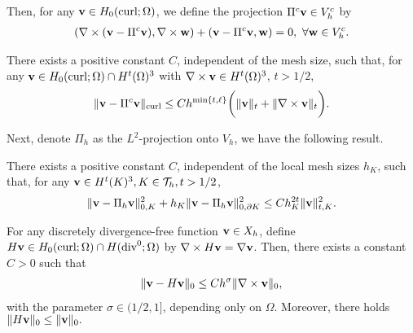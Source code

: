 \documentclass[final,leqno]{siamltex704}
\newcommand{\bv}{{\bf v}}
\def\bv{{\bf v}}
\def\bw{{\bf w}}
\begin{document}
Then, for any $\bv\in H_0(\text{curl};\Omega)$, we define the projection $\Pi^c\bv\in V_h^c$ by
\begin{eqnarray}
(\nabla\times(\bv-\Pi^c\bv),\nabla\times\bw)+(\bv-\Pi^c\bv,\bw)=0,\ \forall\bw\in V_h^c.
\end{eqnarray}

\begin{lemma}
There exists a positive constant $C$, independent of the mesh size, such that, for any $\bv\in H_0(\text{curl};\Omega)\cap H^t(\Omega)^3$ with $\nabla\times\bv\in H^t(\Omega)^3$, $t>1/2$,
\begin{eqnarray}
\|\bv-\Pi^c\bv\|_\text{curl}\le Ch^{\min\{t,\ell\}}\bigg(\|\bv\|_t+\|\nabla\times\bv\|_t\bigg).
\end{eqnarray}
\end{lemma}

Next, denote $\Pi_h$ as the $L^2$-projection onto $V_h$, we have the following result.
\begin{lemma}
There exists a positive constant $C$, independent of the local mesh sizes $h_K$, such that, for any $\bv\in H^t(K)^3, K\in\mathcal{T}_h, t>1/2$,
\begin{eqnarray}
\|\bv-\Pi_h\bv\|_{0,K}^2+h_K\|\bv-\Pi_h\bv\|_{0,\partial K}^2\le Ch_K^{2t}\|\bv\|_{t,K}^2.
\end{eqnarray}
\end{lemma}

\begin{lemma}
For any discretely divergence-free function $\bv\in X_h$, define $H\bv\in H_0(\text{curl};\Omega)\cap H(\text{div}^0;\Omega)$ by $\nabla\times H\bv=\nabla\bv$. Then, there exists a constant $C>0$ such that
\begin{eqnarray}
\|\bv-H\bv\|_0\le Ch^{\sigma}\|\nabla\times\bv\|_0,
\end{eqnarray}
with the parameter $\sigma\in (1/2,1]$, depending only on $\Omega$. Moreover, there holds $\|H\bv\|_0\le \|\bv\|_0.$
\end{lemma}
\end{document}
